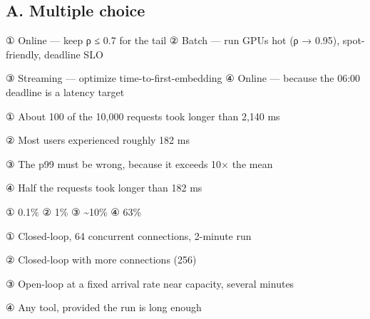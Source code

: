 
\subsection*{A. Multiple choice}


\begin{tbboptions}
  \item ① Online — keep ρ ≤ 0.7 for the tail        ② Batch — run GPUs hot (ρ → 0.95), spot-friendly, deadline SLO
  \item ③ Streaming — optimize time-to-first-embedding        ④ Online — because the 06:00 deadline is a latency target
\end{tbboptions}


\begin{tbboptions}
  \item ① About 100 of the 10,000 requests took longer than 2,140 ms
  \item ② Most users experienced roughly 182 ms
  \item ③ The p99 must be wrong, because it exceeds 10× the mean
  \item ④ Half the requests took longer than 182 ms
\end{tbboptions}


\begin{tbboptions}
  \item ① 0.1\%        ② 1\%        ③ \textasciitilde{}10\%        ④ 63\%
\end{tbboptions}


\begin{tbboptions}
  \item ① Closed-loop, 64 concurrent connections, 2-minute run
  \item ② Closed-loop with more connections (256)
  \item ③ Open-loop at a fixed arrival rate near capacity, several minutes
  \item ④ Any tool, provided the run is long enough
\end{tbboptions}


